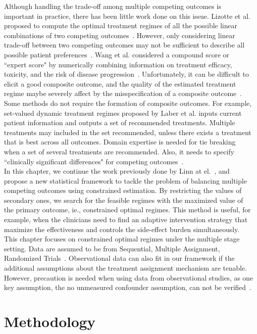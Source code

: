 Although handling the trade-off among multiple competing outcomes is important in practice, there has been little work done on this issue.  Lizotte et al. proposed to compute the optimal treatment regimes of all the possible linear combinations of two competing outcomes~\cite{Lizotte2010}. However, only considering linear trade-off between two competing outcomes may not be sufficient to describe all possible patient preferences~\cite{LaberTwo2014}. Wang et al. considered a compound score or ``expert score" by numerically combining information on treatment efficacy, toxicity, and the risk of disease progression~\cite{Wang2012}. Unfortunately, it can be difficult to elicit a good composite outcome, and the quality of the estimated treatment regime maybe severely affect by the misspecification of a composite outcome~\cite{Laber2014}. Some methods do not require the formation of composite outcomes. For example, set-valued dynamic treatment regimes proposed by Laber et al. inputs current patient information and outputs a set of recommended treatments. Multiple treatments may included in the set recommended, unless there exists a treatment that is best across all outcomes. Domain expertise is needed for tie breaking when a set of several treatments are recommended. Also, it needs to specify ``clinically significant differences" for competing outcomes~\cite{LaberTwo2014}. \\

In this chapter, we continue the work previously done by Linn at el.~\cite{constrained}, and propose a new statistical framework to tackle the problem of balancing multiple competing outcomes using constrained estimation. By restricting the values of secondary ones, we search for the feasible regimes with the maximized value of the primary outcome, ie., constrained optimal regimes. This method is useful, for example, when the clinicians need to find an adaptive intervention strategy that maximize the effectiveness and controls the side-effect burden simultaneously. This chapter focuses on constrained optimal regimes under the multiple stage setting. Data are assumed to be from Sequential, Multiple Assignment, Randomized Trials~\cite{Lei2012}. Observational data can also fit in our framework if the additional assumptions about the treatment assignment mechanism are tenable. However, precaution is needed when using data from observational studies, as one key assumption, the no unmeasured confounder assumption, can not be verified~\cite{Chakraborty2013}. 

\section{Methodology}

